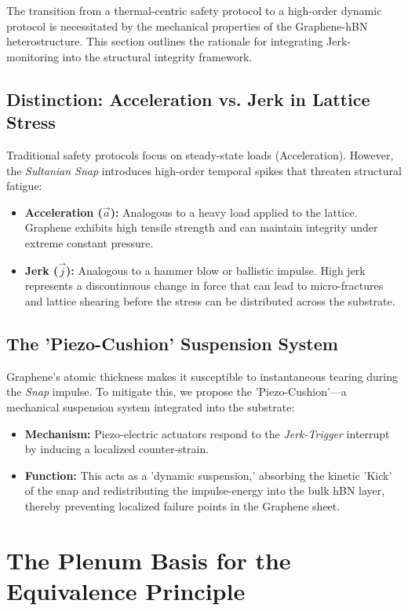 \documentclass[11pt]{article}
\begin{document}
The transition from a thermal-centric safety protocol to a high-order dynamic protocol is necessitated by the mechanical properties of the Graphene-hBN heterostructure. This section outlines the rationale for integrating Jerk-monitoring into the structural integrity framework.

\subsection*{Distinction: Acceleration vs. Jerk in Lattice Stress}
Traditional safety protocols focus on steady-state loads (Acceleration). However, the \textit{Sultanian Snap} introduces high-order temporal spikes that threaten structural fatigue:
\begin{itemize}
    \item \textbf{Acceleration ($\vec{a}$):} Analogous to a heavy load applied to the lattice. Graphene exhibits high tensile strength and can maintain integrity under extreme constant pressure.
    \item \textbf{Jerk ($\vec{j}$):} Analogous to a hammer blow or ballistic impulse. High jerk represents a discontinuous change in force that can lead to micro-fractures and lattice shearing before the stress can be distributed across the substrate.
\end{itemize}

\subsection*{The 'Piezo-Cushion' Suspension System}
Graphene's atomic thickness makes it susceptible to instantaneous tearing during the \textit{Snap} impulse. To mitigate this, we propose the 'Piezo-Cushion'—a mechanical suspension system integrated into the substrate:
\begin{itemize}
    \item \textbf{Mechanism:} Piezo-electric actuators respond to the \textit{Jerk-Trigger} interrupt by inducing a localized counter-strain.
    \item \textbf{Function:} This acts as a 'dynamic suspension,' absorbing the kinetic 'Kick' of the snap and redistributing the impulse-energy into the bulk hBN layer, thereby preventing localized failure points in the Graphene sheet.
\end{itemize}

\section{The Plenum Basis for the Equivalence Principle}
\end{document}

